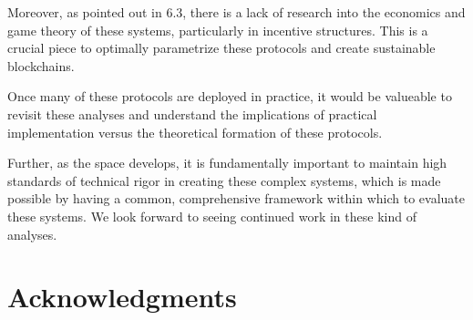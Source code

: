 \documentclass[10pt,journal,compsoc]{IEEEtran}
\begin{document}
Moreover, as pointed out in 6.3, there is a lack of research into the economics and game theory of these systems, particularly in incentive structures. This is a crucial piece to optimally parametrize these protocols and create sustainable blockchains.

Once many of these protocols are deployed in practice, it would be valueable to revisit these analyses and understand the implications of practical implementation versus the theoretical formation of these protocols.

Further, as the space develops, it is fundamentally important to maintain high standards of technical rigor in creating these complex systems, which is made possible by having a common, comprehensive framework within which to evaluate these systems. We look forward to seeing continued work in these kind of analyses.



%



\ifCLASSOPTIONcompsoc
  \section*{Acknowledgments}
\else
\end{document}
